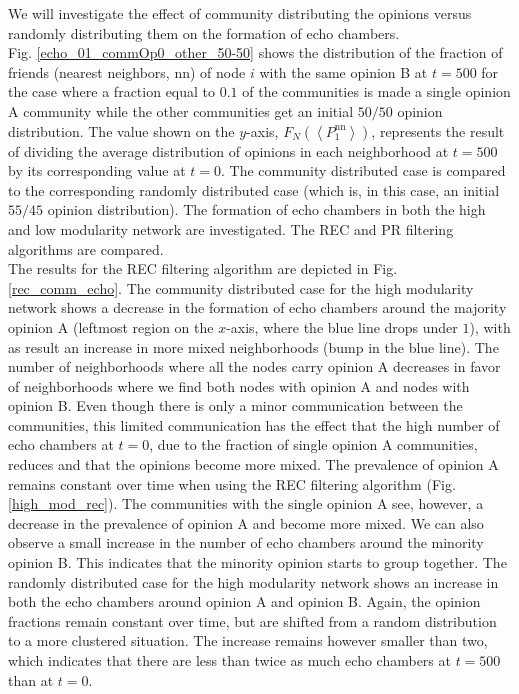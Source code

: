 \documentclass[11 pt , letterpaper , twoside , openright]{book}
\begin{document}
We will investigate the effect of community distributing the opinions versus randomly distributing them on the formation of echo chambers. \\
\newline
Fig. \ref{echo_01_commOp0_other_50-50} shows the distribution of the fraction of friends (nearest neighbors, nn) of node $i$ with the same opinion B at $t=500$ for the case where a fraction equal to $0.1$ of the communities is made a single opinion A community while the other communities get an initial $50/50$ opinion distribution. The value shown on the $y$-axis, $F_N(\left<P_1^{\text{nn}}\right>)$, represents the result of dividing the average distribution of opinions in each neighborhood at $t=500$ by its corresponding value at $t=0$. The community distributed case is compared to the corresponding randomly distributed case (which is, in this case, an initial $55/45$ opinion distribution). The formation of echo chambers in both the high and low modularity network are investigated. The REC and PR filtering algorithms are compared. \\
\newline
The results for the REC filtering algorithm are depicted in Fig. \ref{rec_comm_echo}. The community distributed case for the high modularity network shows a decrease in the formation of echo chambers around the majority opinion A (leftmost region on the $x$-axis, where the blue line drops under $1$), with as result an increase in more mixed neighborhoods (bump in the blue line). The number of neighborhoods where all the nodes carry opinion A decreases in favor of neighborhoods where we find both nodes with opinion A and nodes with opinion B. Even though there is only a minor communication between the communities, this limited communication has the effect that the high number of echo chambers at $t=0$, due to the fraction of single opinion A communities, reduces and that the opinions become more mixed. The prevalence of opinion A remains constant over time when using the REC filtering algorithm (Fig. \ref{high_mod_rec}). The communities with the single opinion A see, however, a decrease in the prevalence of opinion A and become more mixed. We can also observe a small increase in the number of echo chambers around the minority opinion B. This indicates that the minority opinion starts to group together. The randomly distributed case for the high modularity network shows an increase in both the echo chambers around opinion A and opinion B. Again, the opinion fractions remain constant over time, but are shifted from a random distribution to a more clustered situation. The increase remains however smaller than two, which indicates that there are less than twice as much echo chambers at $t=500$ than at $t=0$.\\
\end{document}
